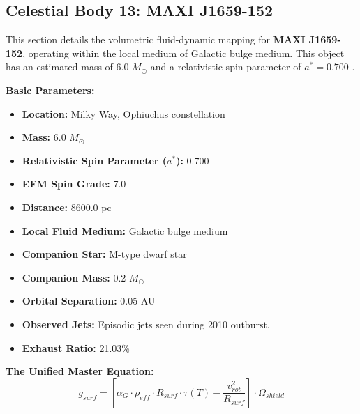 \documentclass[11pt, a4paper]{article}
\begin{document}
\clearpage
\subsection{Celestial Body 13: MAXI J1659-152}
This section details the volumetric fluid-dynamic mapping for \textbf{MAXI J1659-152}, operating within the local medium of Galactic bulge medium. This object has an estimated mass of 6.0 $M_{\odot}$ and a relativistic spin parameter of $a^* = 0.700$ \cite{kuulkers2013, simbad}.

\vspace{0.5em}
\noindent \textbf{Basic Parameters:}
\begin{itemize}
  \item \textbf{Location:} Milky Way, Ophiuchus constellation
  \item \textbf{Mass:} 6.0 $M_{\odot}$
  \item \textbf{Relativistic Spin Parameter ($a^*$):} 0.700
  \item \textbf{EFM Spin Grade:} 7.0
  \item \textbf{Distance:} 8600.0 pc
  \item \textbf{Local Fluid Medium:} Galactic bulge medium
  \item \textbf{Companion Star:} M-type dwarf star
  \item \textbf{Companion Mass:} 0.2 $M_{\odot}$
  \item \textbf{Orbital Separation:} 0.05 AU
  \item \textbf{Observed Jets:} Episodic jets seen during 2010 outburst.
  \item \textbf{Exhaust Ratio:} 21.03\%
\end{itemize}

\vspace{0.5em}
\noindent \textbf{The Unified Master Equation:}
$$ g_{surf} = \left[ \alpha_G \cdot \rho_{eff} \cdot R_{surf} \cdot \tau(T) - \frac{v_{rot}^2}{R_{surf}} \right] \cdot \Omega_{shield} $$
\end{document}

